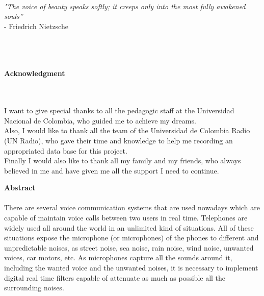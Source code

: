 \newpage{\pagestyle{empty}\cleardoublepage}

\newpage
\thispagestyle{empty} \textbf{}\normalsize
\\\\\\%

\begin{flushright}
\begin{minipage}{8cm}
    \noindent
        \small
        \textit{"The voice of beauty speaks softly; it creeps only into the most fully awakened souls”} \\
- Friedrich Nietzsche
\end{minipage}
\end{flushright}

\newpage
\thispagestyle{empty} \textbf{}\normalsize
\\\\\\%
\textbf{\LARGE Acknowledgment}
\\\\

I want to give special thanks to all the pedagogic staff at the Universidad Nacional de Colombia, who guided me to achieve my dreams.\\

Also, I would like to thank all the team of the Universidad de Colombia Radio (UN Radio), who gave their time and knowledge to help me recording an appropriated data base for this project.\\  

Finally I would also like to thank all my family and my friends, who always believed in me and have given me all the support I need to continue.\\

\newpage{\pagestyle{empty}\cleardoublepage}

\newpage


\textbf{\LARGE Abstract}\\\\

There are several voice communication systems that are used nowadays which are capable of maintain voice calls between two users in real time. Telephones are widely used all around the world in an unlimited kind of situations. All of these situations expose the microphone (or microphones) of the phones to different and unpredictable noises, as street noise, sea noise, rain noise, wind noise, unwanted voices, car motors, etc. As microphones capture all the sounds around it, including the wanted voice and the unwanted noises, it is necessary to implement digital real time filters capable of attenuate as much as possible all the surrounding noises. \\

